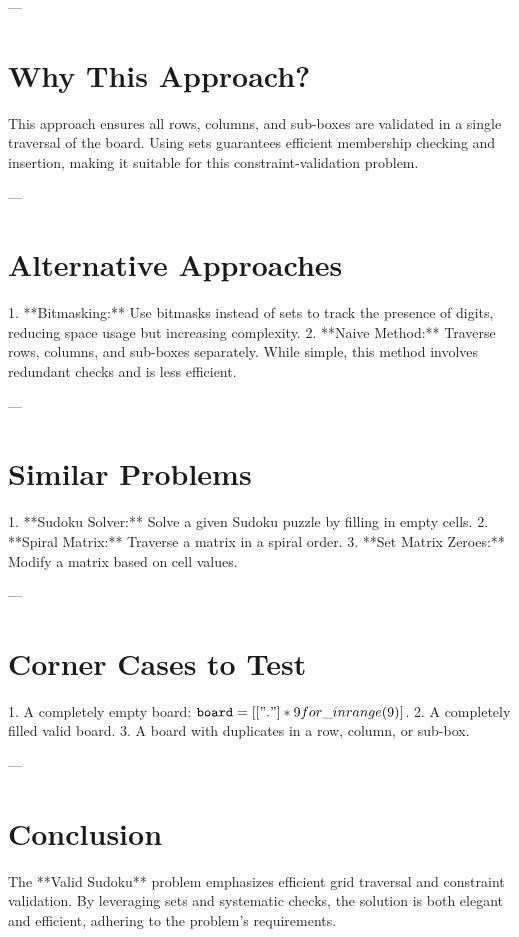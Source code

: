 ---

\section*{Why This Approach?}
This approach ensures all rows, columns, and sub-boxes are validated in a single traversal of the board. Using sets guarantees efficient membership checking and insertion, making it suitable for this constraint-validation problem.

---

\section*{Alternative Approaches}
1. **Bitmasking:** Use bitmasks instead of sets to track the presence of digits, reducing space usage but increasing complexity.
2. **Naive Method:** Traverse rows, columns, and sub-boxes separately. While simple, this method involves redundant checks and is less efficient.

---

\section*{Similar Problems}
1. **Sudoku Solver:** Solve a given Sudoku puzzle by filling in empty cells.
2. **Spiral Matrix:** Traverse a matrix in a spiral order.
3. **Set Matrix Zeroes:** Modify a matrix based on cell values.

---

\section*{Corner Cases to Test}
1. A completely empty board: \( \texttt{board} = [["."] * 9 for \_ in range(9)] \).
2. A completely filled valid board.
3. A board with duplicates in a row, column, or sub-box.

---

\section*{Conclusion}
The **Valid Sudoku** problem emphasizes efficient grid traversal and constraint validation. By leveraging sets and systematic checks, the solution is both elegant and efficient, adhering to the problem's requirements.